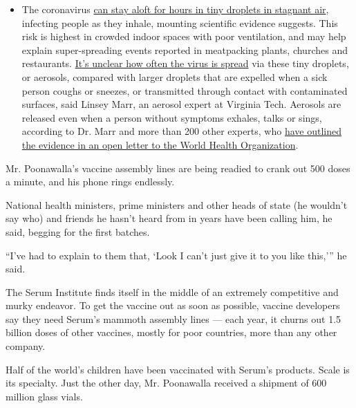 \begin{itemize}
  \begin{itemize}
  \tightlist
  \item
    The coronavirus
    \href{https://www.nytimes.com/2020/07/04/health/239-experts-with-one-big-claim-the-coronavirus-is-airborne.html?action=click\&pgtype=Article\&state=default\&region=MAIN_CONTENT_3\&context=storylines_faq}{can
    stay aloft for hours in tiny droplets in stagnant air}, infecting
    people as they inhale, mounting scientific evidence suggests. This
    risk is highest in crowded indoor spaces with poor ventilation, and
    may help explain super-spreading events reported in meatpacking
    plants, churches and restaurants.
    \href{https://www.nytimes.com/2020/07/06/health/coronavirus-airborne-aerosols.html?action=click\&pgtype=Article\&state=default\&region=MAIN_CONTENT_3\&context=storylines_faq}{It's
    unclear how often the virus is spread} via these tiny droplets, or
    aerosols, compared with larger droplets that are expelled when a
    sick person coughs or sneezes, or transmitted through contact with
    contaminated surfaces, said Linsey Marr, an aerosol expert at
    Virginia Tech. Aerosols are released even when a person without
    symptoms exhales, talks or sings, according to Dr. Marr and more
    than 200 other experts, who
    \href{https://academic.oup.com/cid/article/doi/10.1093/cid/ciaa939/5867798}{have
    outlined the evidence in an open letter to the World Health
    Organization}.
  \end{itemize}
\end{itemize}

Mr. Poonawalla's vaccine assembly lines are being readied to crank out
500 doses a minute, and his phone rings endlessly.

National health ministers, prime ministers and other heads of state (he
wouldn't say who) and friends he hasn't heard from in years have been
calling him, he said, begging for the first batches.

``I've had to explain to them that, `Look I can't just give it to you
like this,''' he said.

The Serum Institute finds itself in the middle of an extremely
competitive and murky endeavor. To get the vaccine out as soon as
possible, vaccine developers say they need Serum's mammoth assembly
lines --- each year, it churns out 1.5 billion doses of other vaccines,
mostly for poor countries, more than any other company.

Half of the world's children have been vaccinated with Serum's products.
Scale is its specialty. Just the other day, Mr. Poonawalla received a
shipment of 600 million glass vials.

